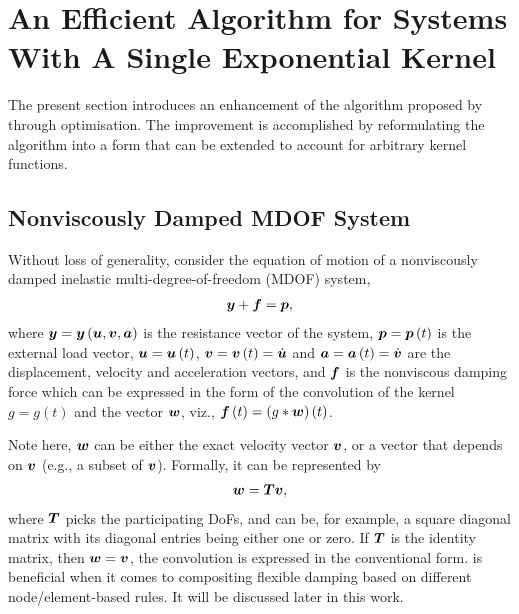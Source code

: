 \section{An Efficient Algorithm for Systems With A Single Exponential Kernel}\label{sec:single}
The present section introduces an enhancement of the algorithm proposed by \citet{Adhikari2004} through optimisation. The improvement is accomplished by reformulating the algorithm into a form that can be extended to account for arbitrary kernel functions.
\subsection{Nonviscously Damped MDOF System}
Without loss of generality, consider the equation of motion of a nonviscously damped inelastic multi-degree-of-freedom (MDOF) system,
\begin{gather}\label{eq:eom}
\bm{y}+\bm{f}=\bm{p},
\end{gather}
where $\bm{y}=\bm{y}\left(\bm{u},\bm{v},\bm{a}\right)$ is the resistance vector of the system, $\bm{p}=\bm{p}\left(t\right)$ is the external load vector, $\bm{u}=\bm{u}\left(t\right)$, $\bm{v}=\bm{v}\left(t\right)=\dot{\bm{u}}$ and $\bm{a}=\bm{a}\left(t\right)=\dot{\bm{v}}$ are the displacement, velocity and acceleration vectors, and $\bm{f}$ is the nonviscous damping force which can be expressed in the form of the convolution of the kernel $g=g\left(t\right)$ and the vector $\bm{w}$, viz., $\bm{f}\left(t\right)=\left(g*\bm{w}\right)\left(t\right)$.

Note here, $\bm{w}$ can be either the exact velocity vector $\bm{v}$, or a vector that depends on $\bm{v}$ (e.g., a subset of $\bm{v}$). Formally, it can be represented by
\begin{gather}\label{eq:wv}
\bm{w}=\bm{T}\bm{v},
\end{gather}
where $\bm{T}$ picks the participating DoFs, and can be, for example, a square diagonal matrix with its diagonal entries being either one or zero. If $\bm{T}$ is the identity matrix, then $\bm{w}=\bm{v}$, the convolution is expressed in the conventional form.  is beneficial when it comes to compositing flexible damping based on different node/element-based rules. It will be discussed later in this work.
